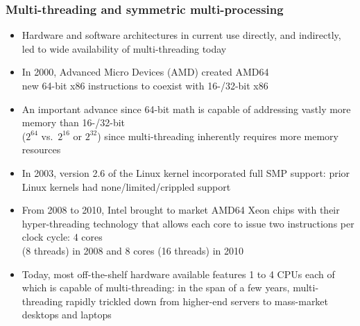 \documentclass[11pt,pdftex,dvipsnames,usenames,helvetica]{beamer}
\begin{document}
\begin{frame}[fragile]
\frametitle{Multi-threading and symmetric multi-processing}

\begin{itemize}
\item Hardware and
software architectures in current use directly, and indirectly,
led to wide availability of multi-threading today
\item In 2000, Advanced Micro Devices (AMD) created AMD64\\
  new 64-bit x86 instructions to coexist with 16-/32-bit x86 
\item An important advance since 64-bit math is capable of addressing
  vastly
  more memory than 16-/32-bit\\
  ($2^{64}$ vs.\ $2^{16}$ or $2^{32}$) since multi-threading
  inherently requires more memory resources
\item In 2003, version 2.6 of the Linux kernel incorporated full SMP
  support: prior Linux kernels had none/limited/crippled support
\item From 2008 to 2010, Intel brought to market AMD64 Xeon chips with
  their hyper-threading technology that allows each core to issue two
  instructions per clock cycle: 4 cores\\ (8 threads) in 2008 and 8
  cores (16 threads) in 2010
\item Today, most off-the-shelf hardware available features 1 to 4
  CPUs each of which is capable of multi-threading: in the span of a
  few years, multi-threading rapidly trickled down from higher-end
  servers to mass-market desktops and laptops
\end{itemize}
\end{frame}
\end{document}
